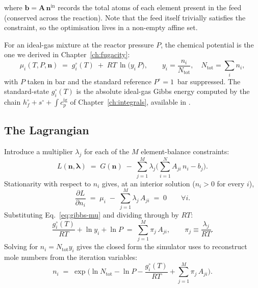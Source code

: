 \documentclass[11pt,a4paper]{article}
\begin{document}
where $\mathbf{b} = \mathbf{A}\,\mathbf{n}^{\mathrm{in}}$ records the
total atoms of each element present in the feed (conserved across the
reaction).  Note that the feed itself trivially satisfies the
constraint, so the optimisation lives in a non-empty affine set.

For an ideal-gas mixture at the reactor pressure $P$, the chemical
potential is the one we derived in
Chapter~\ref{ch:fugacity}:
\begin{equation}
   \mu_i(T, P, \mathbf{n})
   \;=\; g_i^{\circ}(T) \;+\; RT\,\ln\!\bigl(y_i\,P\bigr),
   \qquad y_i = \frac{n_i}{N_{\mathrm{tot}}}, \quad
   N_{\mathrm{tot}} = \sum_i n_i,
   \label{eq:gibbs-mu}
\end{equation}
with $P$ taken in bar and the standard reference $P^{\circ} = 1$~bar
suppressed.  The standard-state $g_i^{\circ}(T)$ is the absolute
ideal-gas Gibbs energy computed by the chain
$h_f^{\circ} + s^{\circ} + \int c_p^{\mathrm{ig}}$ of
Chapter~\ref{ch:integrals}, available in
.

\subsection{The Lagrangian}

Introduce a multiplier $\lambda_j$ for each of the $M$ element-balance
constraints:
\begin{equation}
   L(\mathbf{n}, \boldsymbol{\lambda})
   \;=\; G(\mathbf{n})
        \;-\; \sum_{j=1}^{M} \lambda_j
              \Biggl(\sum_{i=1}^{N} A_{ji}\,n_i - b_j\Biggr).
\end{equation}
Stationarity with respect to $n_i$ gives, at an interior solution
($n_i > 0$ for every $i$),
\begin{equation}
   \frac{\partial L}{\partial n_i} \;=\;
   \mu_i \;-\; \sum_{j=1}^{M} \lambda_j\,A_{ji} \;=\; 0
   \qquad \forall i.
   \label{eq:gibbs-stationarity}
\end{equation}
Substituting Eq.~\eqref{eq:gibbs-mu} and dividing through by $RT$:
\begin{equation}
   \frac{g_i^{\circ}(T)}{RT} + \ln y_i + \ln P
   \;=\; \sum_{j=1}^{M} \pi_j\,A_{ji},
   \qquad \pi_j \equiv \frac{\lambda_j}{RT}.
\end{equation}
Solving for $n_i = N_{\mathrm{tot}} y_i$ gives the closed form the
simulator uses to reconstruct mole numbers from the iteration
variables:
\begin{equation}
   \boxed{\;
   n_i \;=\;
   \exp\Biggl(
       \ln N_{\mathrm{tot}}
       - \ln P
       - \frac{g_i^{\circ}(T)}{RT}
       + \sum_{j=1}^{M} \pi_j\,A_{ji}
   \Biggr).
   \;}
   \label{eq:gibbs-ni}
\end{equation}
\end{document}
